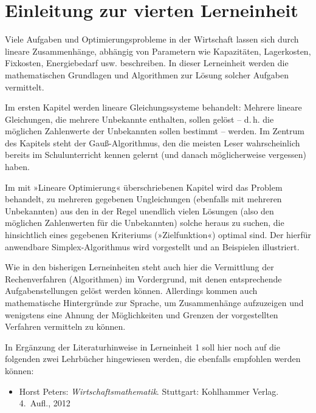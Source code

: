 \chapter*{Einleitung zur vierten Lerneinheit}

Viele Aufgaben und Optimierungsprobleme in der Wirtschaft lassen sich durch lineare Zusammenhänge, abhängig von Parametern wie Kapazitäten, Lagerkosten, Fixkosten, Energiebedarf usw. beschreiben. In dieser Lerneinheit werden die mathematischen Grundlagen und Algorithmen zur Lösung solcher Aufgaben vermittelt.

Im ersten Kapitel werden lineare Gleichungssysteme behandelt: Mehrere lineare Gleichungen, die mehrere Unbekannte enthalten, sollen gelöst -- d.\,h. die möglichen Zahlenwerte der Unbekannten sollen bestimmt -- werden. Im Zentrum des Kapitels steht der Gauß-Algorithmus, den die meisten Leser wahrscheinlich bereits im Schulunterricht kennen gelernt (und danach möglicherweise vergessen) haben.

Im mit »Lineare Optimierung« überschriebenen Kapitel wird das Problem behandelt, zu mehreren gegebenen Ungleichungen (ebenfalls mit mehreren Unbekannten) aus den in der Regel unendlich vielen Lösungen (also den möglichen Zahlenwerten für die Unbekannten) solche heraus zu suchen, die hinsichtlich eines gegebenen Kriteriums (»Zielfunktion«) optimal sind. Der hierfür anwendbare Simplex-Algorithmus wird vorgestellt und an Beispielen illustriert.

Wie in den bisherigen Lerneinheiten steht auch hier die Vermittlung der Rechenverfahren (Algorithmen) im Vordergrund, mit denen entsprechende Aufgabenstellungen gelöst werden können. Allerdings kommen auch mathematische Hintergründe zur Sprache, um Zusammenhänge aufzuzeigen und wenigstens eine Ahnung der Möglichkeiten und Grenzen der vorgestellten Verfahren vermitteln zu können.

In Ergänzung der Literaturhinweise in Lerneinheit 1 soll hier noch auf die folgenden zwei Lehrbücher hingewiesen werden, die ebenfalls empfohlen werden können:
\begin{itemize}
  \item Horst Peters: \emph{Wirtschaftsmathematik}. Stuttgart: Kohlhammer Verlag. 4.\ Aufl., 2012
\end{itemize}
